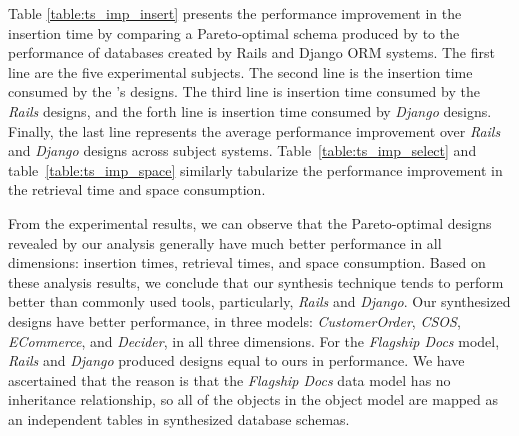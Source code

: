 \documentclass[10pt,conference]{IEEEtran}
\begin{document}

Table \ref{table:ts_imp_insert} presents the performance improvement in the insertion time by comparing a Pareto-optimal schema produced by \@approach to the performance of databases created by   Rails and Django ORM systems. The first line are the five experimental subjects. The second line is the insertion time consumed by the \@approach's designs. The third line is insertion time consumed by the {\em Rails} designs, and the forth line is insertion time consumed by {\em Django} designs. Finally, the last line represents the average performance improvement over {\em Rails} and {\em Django} designs across subject systems. %
Table~\ref{table:ts_imp_select} and table~\ref{table:ts_imp_space} similarly tabularize the performance improvement in the retrieval time and space consumption. %

From the experimental results, we can observe that the Pareto-optimal designs revealed by our analysis generally have much better performance in all dimensions: insertion times, retrieval times, and space consumption. Based on these analysis results, we conclude that our synthesis technique tends to perform better than commonly used tools, particularly, {\em Rails} and {\em Django}. Our synthesized designs have better performance, in three models: {\em CustomerOrder}, {\em CSOS}, {\em ECommerce}, and {\em Decider}, in all three dimensions. For the {\em Flagship Docs} model, {\em Rails} and {\em Django} produced designs equal to ours in performance. We have ascertained that the reason is that the {\em Flagship Docs} data model has no inheritance relationship, so all of the objects in the object model are mapped as an independent tables in synthesized database schemas.
\end{document}
